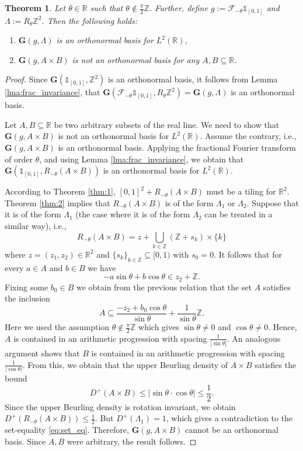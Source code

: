 \documentclass[reqno,a4paper,12pt]{amsart}
\numberwithin{equation}{section}
\newtheorem{theorem}[definition]{Theorem}
\def\Z{{\mathbb Z}}
\def\R{{\mathbb R}}
\newcommand{\lt}{{L^2(\R)}}
\newcommand{\ft}{{\mathcal{F}}}
\newcommand\1{\mathds{1}}
\begin{document}
\begin{theorem}\label{thm:io_answer}
    Let $\theta \in \R$ such that $\theta \not \in \frac \pi 2 \Z$. Further, define $g:=\ft_{-\theta} \1_{[0,1]}$ and $\Lambda := R_{\theta}\Z^2$. Then the following holds:
    \begin{enumerate}
        \item $\mathbf{G}(g,\Lambda)$ is an orthonormal basis for $\lt$,
        \item $\mathbf{G}(g,A \times B)$ is not an orthonormal basis for any $A,B \subseteq \R$.
    \end{enumerate}
\end{theorem}
\begin{proof}
Since $\mathbf{G}(\1_{[0,1]},\Z^2)$ is an orthonormal basis, it follows from Lemma \ref{lma:frac_invariance}, that $\mathbf{G}(\ft_{-\theta} \1_{[0,1]},R_{\theta}\Z^2) = \mathbf{G}(g,\Lambda)$ is an orthonormal basis.

Let $A,B \subseteq \R$ be two arbitrary subsets of the real line. We need to show that $\mathbf{G}(g, A \times B)$ is not an orthonormal basis for $\lt$.
Assume the contrary, i.e., $\mathbf{G}(g, A \times B)$ is an orthonormal basis.
Applying the fractional Fourier transform of order $\theta$, and using Lemma \ref{lma:frac_invariance}, we obtain that
    $
    \mathbf{G}(\1_{[0,1]}, R_{-\theta}(A \times B))
    $
    is an orthonormal basis for $\lt$.
    
According to Theorem \ref{thm:1}, $[0,1]^2 + R_{-\theta}(A \times B)$ must be a tiling for $\R^2$. Theorem \ref{thm:2} implies that $R_{-\theta}(A \times B)$ is of the form $\Lambda_1$ or $\Lambda_2$. Suppose that it is of the form $\Lambda_1$ (the case where it is of the form $\Lambda_2$ can be treated in a similar way), i.e.,
\begin{equation}\label{eq:set_eq}
    R_{-\theta}(A \times B) = z + \bigcup_{k \in \Z} (\Z + s_k) \times \{ k \}
\end{equation}
where $z = (z_1,z_2) \in \R^2$ and $\{ s_k \}_{k \in \Z} \subseteq [0,1)$ with $s_0=0$. It follows that for every $a \in A$ and $b \in B$ we have
$$
-a \sin \theta + b \cos \theta \in z_2 + \Z.
$$
Fixing some $b_0 \in B$ we obtain from the previous relation that the set $A$ satisfies the inclusion
$$
A \subseteq \frac{-z_2 + b_0 \cos \theta}{\sin \theta} + \frac{1}{\sin \theta} \Z.
$$
Here we used the assumption $\theta \not \in \frac \pi2 \Z$ which gives $\sin \theta \neq 0$ and $\cos \theta \neq 0$. Hence, $A$ is contained in an arithmetic progression with spacing $\frac{1}{|\sin \theta|}$. An analogous argument shows that $B$ is contained in an arithmetic progression with spacing $\frac{1}{|\cos \theta|}$. From this, we obtain that the upper Beurling density of $A \times B$ satisfies the bound
$$
D^+(A \times B) \leq |\sin \theta \cdot \cos \theta| \leq \frac 12.
$$
Since the upper Beurling density is rotation invariant, we obtain $D^+(R_{-\theta}(A \times B)) \leq \frac 12$. But $D^+(\Lambda_1) = 1$, which gives a contradiction to the set-equality \eqref{eq:set_eq}. Therefore, $\mathbf{G}(g,A \times B)$ cannot be an orthonormal basis. Since $A,B$ were arbitrary, the result follows.
\end{proof}
\end{document}
